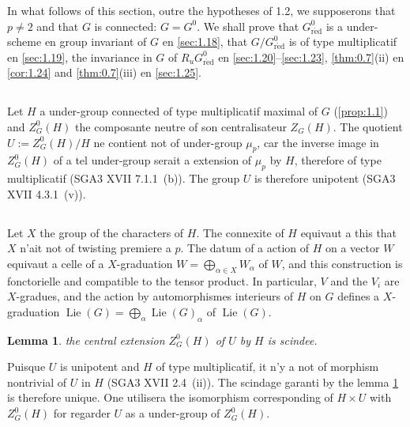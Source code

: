 \documentclass[11pt,a4paper]{article}
\theoremstyle{plain}
\newtheorem{lemma}[theorem]{Lemma}
\theoremstyle{definition}
\DeclareMathOperator{\Lie}{Lie}
\newcommand{\red}{\mathrm{r\acute{e}d}}
\begin{document}
In what follows of this section, outre the hypotheses of 1.2, we supposerons that $p \neq 2$ and that $G$ is connected: $G = G^0$. We shall prove that $G^0_\red$ is a under-scheme en group invariant of $G$ en \ref{sec:1.18}, that $G/G^0_\red$ is of type multiplicatif en \ref{sec:1.19}, the invariance in $G$ of $R_u G^0_\red$ en \ref{sec:1.20}--\ref{sec:1.23}, \ref{thm:0.7}(ii) en \ref{cor:1.24} and \ref{thm:0.7}(iii) en \ref{sec:1.25}.

\subsection{}
Let $H$ a under-group connected of type multiplicatif maximal of $G$ (\ref{prop:1.1}) and $Z^0_G(H)$ the composante neutre of son centralisateur $Z_G(H)$. The quotient $U := Z^0_G(H)/H$ ne contient not of under-group $\mu_p$, car the inverse image in $Z^0_G(H)$ of a tel under-group serait a extension of $\mu_p$ by $H$, therefore of type multiplicatif (SGA3 XVII 7.1.1~(b)). The group $U$ is therefore unipotent (SGA3 XVII 4.3.1~(v)).

\subsection{}
Let $X$ the group of the characters of $H$. The connexite of $H$ equivaut a this that $X$ n'ait not of twisting premiere a $p$. The datum of a action of $H$ on a vector $W$ equivaut a celle of a $X$-graduation $W = \bigoplus_{\alpha \in X} W_\alpha$ of $W$, and this construction is fonctorielle and compatible to the tensor product. In particular, $V$ and the $V_i$ are $X$-gradues, and the action by automorphismes interieurs of $H$ on $G$ defines a $X$-graduation $\Lie(G) = \bigoplus_\alpha \Lie(G)_\alpha$ of $\Lie(G)$.

\begin{lemma}\label{lem:1.7}
the central extension $Z^0_G(H)$ of $U$ by $H$ is scindee.
\end{lemma}

Puisque $U$ is unipotent and $H$ of type multiplicatif, it n'y a not of morphism nontrivial of $U$ in $H$ (SGA3 XVII 2.4~(ii)). The scindage garanti by the lemma \ref{lem:1.7} is therefore unique. One utilisera the isomorphism corresponding of $H \times U$ with $Z^0_G(H)$ for regarder $U$ as a under-group of $Z^0_G(H)$.
\end{document}
